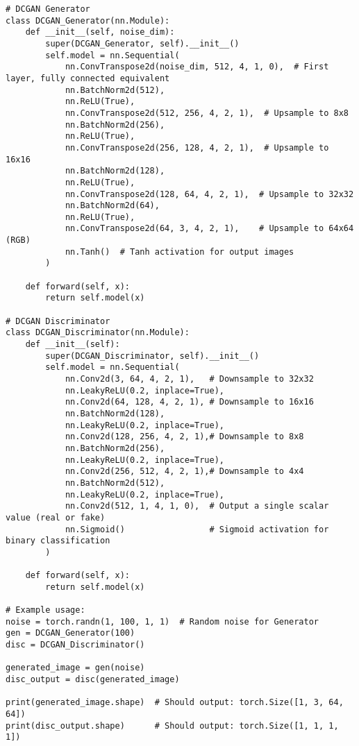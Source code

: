\begin{lstlisting}[style=python]
# DCGAN Generator
class DCGAN_Generator(nn.Module):
    def __init__(self, noise_dim):
        super(DCGAN_Generator, self).__init__()
        self.model = nn.Sequential(
            nn.ConvTranspose2d(noise_dim, 512, 4, 1, 0),  # First layer, fully connected equivalent
            nn.BatchNorm2d(512),
            nn.ReLU(True),
            nn.ConvTranspose2d(512, 256, 4, 2, 1),  # Upsample to 8x8
            nn.BatchNorm2d(256),
            nn.ReLU(True),
            nn.ConvTranspose2d(256, 128, 4, 2, 1),  # Upsample to 16x16
            nn.BatchNorm2d(128),
            nn.ReLU(True),
            nn.ConvTranspose2d(128, 64, 4, 2, 1),  # Upsample to 32x32
            nn.BatchNorm2d(64),
            nn.ReLU(True),
            nn.ConvTranspose2d(64, 3, 4, 2, 1),    # Upsample to 64x64 (RGB)
            nn.Tanh()  # Tanh activation for output images
        )

    def forward(self, x):
        return self.model(x)

# DCGAN Discriminator
class DCGAN_Discriminator(nn.Module):
    def __init__(self):
        super(DCGAN_Discriminator, self).__init__()
        self.model = nn.Sequential(
            nn.Conv2d(3, 64, 4, 2, 1),   # Downsample to 32x32
            nn.LeakyReLU(0.2, inplace=True),
            nn.Conv2d(64, 128, 4, 2, 1), # Downsample to 16x16
            nn.BatchNorm2d(128),
            nn.LeakyReLU(0.2, inplace=True),
            nn.Conv2d(128, 256, 4, 2, 1),# Downsample to 8x8
            nn.BatchNorm2d(256),
            nn.LeakyReLU(0.2, inplace=True),
            nn.Conv2d(256, 512, 4, 2, 1),# Downsample to 4x4
            nn.BatchNorm2d(512),
            nn.LeakyReLU(0.2, inplace=True),
            nn.Conv2d(512, 1, 4, 1, 0),  # Output a single scalar value (real or fake)
            nn.Sigmoid()                 # Sigmoid activation for binary classification
        )

    def forward(self, x):
        return self.model(x)

# Example usage:
noise = torch.randn(1, 100, 1, 1)  # Random noise for Generator
gen = DCGAN_Generator(100)
disc = DCGAN_Discriminator()

generated_image = gen(noise)
disc_output = disc(generated_image)

print(generated_image.shape)  # Should output: torch.Size([1, 3, 64, 64])
print(disc_output.shape)      # Should output: torch.Size([1, 1, 1, 1])
\end{lstlisting}

